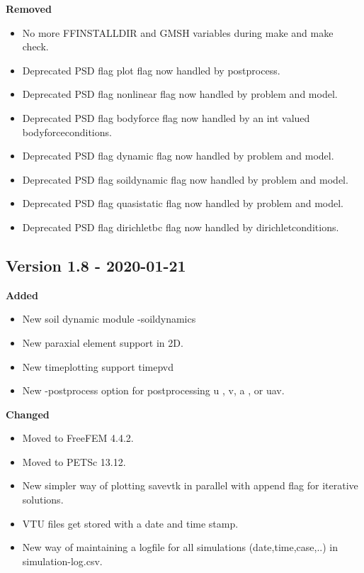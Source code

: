 \documentclass{report}
\begin{document}
\textbf{Removed}
\begin{itemize}
\item No more {\ttfamily FFINSTALLDIR} and {\ttfamily GMSH} variables during {\ttfamily make} and {\ttfamily make check}.
\item Deprecated PSD flag  {\ttfamily plot} flag now handled by {\ttfamily postprocess}.
\item Deprecated PSD flag {\ttfamily nonlinear} flag now handled by {\ttfamily problem} and {\ttfamily model}.
\item Deprecated PSD flag {\ttfamily bodyforce} flag now handled by an {\ttfamily int} valued {\ttfamily bodyforceconditions}.
\item Deprecated PSD flag {\ttfamily dynamic} flag now handled by {\ttfamily problem} and {\ttfamily model}.
\item Deprecated PSD flag {\ttfamily soildynamic} flag now handled by {\ttfamily problem} and {\ttfamily model}.
\item Deprecated PSD flag {\ttfamily quasistatic} flag now handled by {\ttfamily problem} and {\ttfamily model}.
\item Deprecated PSD flag {\ttfamily dirichletbc} flag now handled by {\ttfamily dirichletconditions}.
\end{itemize}

\subsection{Version 1.8 - 2020-01-21}
\textbf{Added}
\begin{itemize}
 \item New soil dynamic module {\ttfamily -soildynamics}
 \item New paraxial element support in 2D.
 \item New timeplotting support {\ttfamily timepvd}
 \item New {\ttfamily -postprocess} option for postprocessing {\ttfamily u} , {\ttfamily v},  {\ttfamily a} , or {\ttfamily uav}. 
\end{itemize}

\textbf{Changed}
\begin{itemize}
 \item Moved to FreeFEM 4.4.2.
 \item Moved to PETSc 13.12.
 \item New simpler way of plotting {\ttfamily savevtk} in parallel with {\ttfamily append} flag for iterative solutions.
 \item VTU files get stored with a date and time stamp.
 \item New way of maintaining a logfile for all simulations (date,time,case,..) in {\ttfamily simulation-log.csv}.
\end{itemize}
\end{document}
